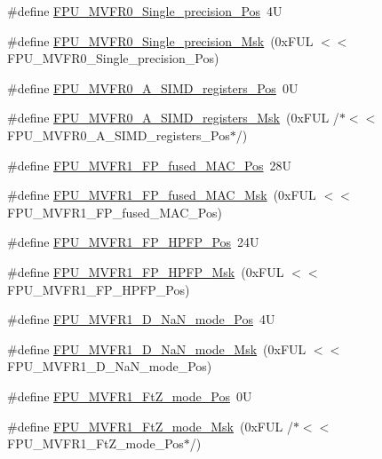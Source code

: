 \begin{DoxyCompactItemize}
\item 
\#define \mbox{\hyperlink{group___c_m_s_i_s___f_p_u_ga1b4e9fe31992b1495c7a158747d42571}{F\+P\+U\+\_\+\+M\+V\+F\+R0\+\_\+\+Single\+\_\+precision\+\_\+\+Pos}}~4U
\item 
\#define \mbox{\hyperlink{group___c_m_s_i_s___f_p_u_ga95008f205c9d25e4ffebdbdc50d5ae44}{F\+P\+U\+\_\+\+M\+V\+F\+R0\+\_\+\+Single\+\_\+precision\+\_\+\+Msk}}~(0x\+F\+U\+L $<$$<$ F\+P\+U\+\_\+\+M\+V\+F\+R0\+\_\+\+Single\+\_\+precision\+\_\+\+Pos)
\item 
\#define \mbox{\hyperlink{group___c_m_s_i_s___f_p_u_gaa1de44af3e3162c8c176a57564611618}{F\+P\+U\+\_\+\+M\+V\+F\+R0\+\_\+\+A\+\_\+\+S\+I\+M\+D\+\_\+registers\+\_\+\+Pos}}~0U
\item 
\#define \mbox{\hyperlink{group___c_m_s_i_s___f_p_u_ga118f13f9562805356e92b5ad52573021}{F\+P\+U\+\_\+\+M\+V\+F\+R0\+\_\+\+A\+\_\+\+S\+I\+M\+D\+\_\+registers\+\_\+\+Msk}}~(0x\+F\+U\+L /$\ast$$<$$<$ F\+P\+U\+\_\+\+M\+V\+F\+R0\+\_\+\+A\+\_\+\+S\+I\+M\+D\+\_\+registers\+\_\+\+Pos$\ast$/)
\item 
\#define \mbox{\hyperlink{group___c_m_s_i_s___f_p_u_ga68c53771f02f4c73122a7b40796549cc}{F\+P\+U\+\_\+\+M\+V\+F\+R1\+\_\+\+F\+P\+\_\+fused\+\_\+\+M\+A\+C\+\_\+\+Pos}}~28U
\item 
\#define \mbox{\hyperlink{group___c_m_s_i_s___f_p_u_gaf5129ab18948ff573a1ab29f0be47bc2}{F\+P\+U\+\_\+\+M\+V\+F\+R1\+\_\+\+F\+P\+\_\+fused\+\_\+\+M\+A\+C\+\_\+\+Msk}}~(0x\+F\+U\+L $<$$<$ F\+P\+U\+\_\+\+M\+V\+F\+R1\+\_\+\+F\+P\+\_\+fused\+\_\+\+M\+A\+C\+\_\+\+Pos)
\item 
\#define \mbox{\hyperlink{group___c_m_s_i_s___f_p_u_ga02ceac0abcbdc8670633056bec005bfd}{F\+P\+U\+\_\+\+M\+V\+F\+R1\+\_\+\+F\+P\+\_\+\+H\+P\+F\+P\+\_\+\+Pos}}~24U
\item 
\#define \mbox{\hyperlink{group___c_m_s_i_s___f_p_u_gafe29dd327ed3b723b3f01759568e116d}{F\+P\+U\+\_\+\+M\+V\+F\+R1\+\_\+\+F\+P\+\_\+\+H\+P\+F\+P\+\_\+\+Msk}}~(0x\+F\+U\+L $<$$<$ F\+P\+U\+\_\+\+M\+V\+F\+R1\+\_\+\+F\+P\+\_\+\+H\+P\+F\+P\+\_\+\+Pos)
\item 
\#define \mbox{\hyperlink{group___c_m_s_i_s___f_p_u_gae34d7ce42e50e2f1ea3e654fd3ba690a}{F\+P\+U\+\_\+\+M\+V\+F\+R1\+\_\+\+D\+\_\+\+Na\+N\+\_\+mode\+\_\+\+Pos}}~4U
\item 
\#define \mbox{\hyperlink{group___c_m_s_i_s___f_p_u_gad6af7c4632dba5a417307d456fe9b8a7}{F\+P\+U\+\_\+\+M\+V\+F\+R1\+\_\+\+D\+\_\+\+Na\+N\+\_\+mode\+\_\+\+Msk}}~(0x\+F\+U\+L $<$$<$ F\+P\+U\+\_\+\+M\+V\+F\+R1\+\_\+\+D\+\_\+\+Na\+N\+\_\+mode\+\_\+\+Pos)
\item 
\#define \mbox{\hyperlink{group___c_m_s_i_s___f_p_u_ga7faa5bfa85036f8511793234cbbc2409}{F\+P\+U\+\_\+\+M\+V\+F\+R1\+\_\+\+Ft\+Z\+\_\+mode\+\_\+\+Pos}}~0U
\item 
\#define \mbox{\hyperlink{group___c_m_s_i_s___f_p_u_gac566bde39a7afcceffbb21d830c269c1}{F\+P\+U\+\_\+\+M\+V\+F\+R1\+\_\+\+Ft\+Z\+\_\+mode\+\_\+\+Msk}}~(0x\+F\+U\+L /$\ast$$<$$<$ F\+P\+U\+\_\+\+M\+V\+F\+R1\+\_\+\+Ft\+Z\+\_\+mode\+\_\+\+Pos$\ast$/)
\end{DoxyCompactItemize}


